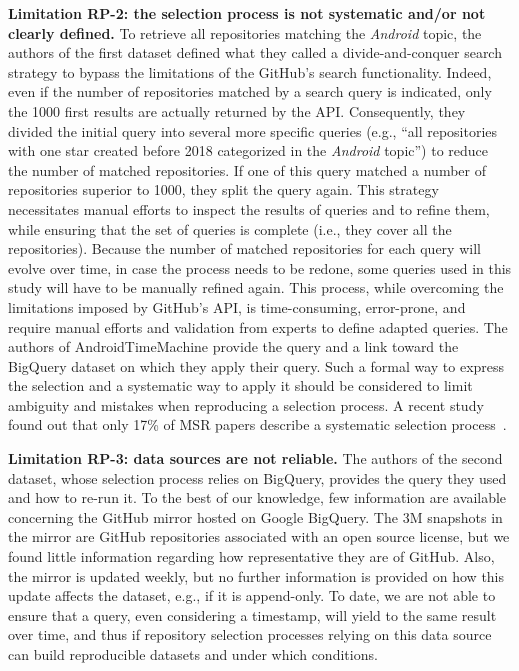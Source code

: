 \textbf{Limitation RP-2: the selection process is not systematic and/or not clearly defined.}
To retrieve all repositories matching the \textit{Android} topic, the authors of the first dataset defined what they called a divide-and-conquer search strategy to bypass the limitations of the GitHub's search functionality.
Indeed, even if the number of repositories matched by a search query is indicated, only the \num{1000} first results are actually returned by the API.
Consequently, they divided the initial query into several more specific queries (e.g., ``all repositories with one star created before 2018 categorized in the \textit{Android} topic'') to reduce the number of matched repositories.
If one of this query matched a number of repositories superior to \num{1000}, they split the query again.
This strategy necessitates manual efforts to inspect the results of queries and to refine them, while ensuring that the set of queries is complete (i.e., they cover all the repositories).
Because the number of matched repositories for each query will evolve over time, in case the process needs to be redone, some queries used in this study will have to be manually refined again.
This process, while overcoming the limitations imposed by GitHub's API, is time-consuming, error-prone, and require manual efforts and validation from experts to define adapted queries.
The authors of AndroidTimeMachine provide the query and a link toward the BigQuery dataset on which they apply their query.
Such a formal way to express the selection and a systematic way to apply it should be considered to limit ambiguity and mistakes when reproducing a selection process.
A recent study found out that only 17\% of MSR papers describe a systematic selection process~\cite{vidoni2022systematic}.



\bigskip

\textbf{Limitation RP-3: data sources are not reliable.}
The authors of the second dataset, whose selection process relies on BigQuery, provides the query they used and how to re-run it.
To the best of our knowledge, few information are available concerning the GitHub mirror hosted on Google BigQuery.
The 3M snapshots in the mirror are GitHub repositories associated with an open source license, but we found little information regarding how representative they are of GitHub.
Also, the mirror is updated weekly, but no further information is provided on how this update affects the dataset, e.g., if it is append-only.
To date, we are not able to ensure that a query, even considering a timestamp, will yield to the same result over time, and thus if repository selection processes relying on this data source can build reproducible datasets and under which conditions.

